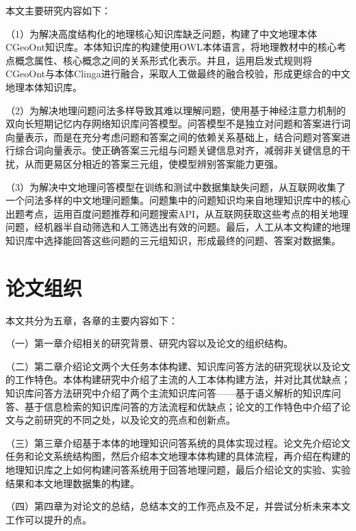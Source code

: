 本文主要研究内容如下：

（1）为解决高度结构化的地理核心知识库缺乏问题，构建了中文地理本体CGeoOnt知识库。本体知识库的构建使用OWL本体语言，将地理教材中的核心考点概念属性、核心概念之间的关系形式化表示。并且，运用启发式规则将CGeoOnt与本体Clinga进行融合，采取人工做最终的融合校验，形成更综合的中文地理本体知识库。

（2）为解决地理问题问法多样导致其难以理解问题，使用基于神经注意力机制的双向长短期记忆内存网络知识库问答模型。问答模型不是独立对问题和答案进行词向量表示，而是在充分考虑问题和答案之间的依赖关系基础上，结合问题对答案进行综合词向量表示。使正确答案三元组与问题关键信息对齐，减弱非关键信息的干扰，从而更易区分相近的答案三元组，使模型辨别答案能力更强。

（3）为解决中文地理问答模型在训练和测试中数据集缺失问题，从互联网收集了一个问法多样的中文地理问题集。问题集中的问题知识均来自地理知识库中的核心出题考点，运用百度问题推荐和问题搜索API，从互联网获取这些考点的相关地理问题，经机器半自动筛选和人工筛选出有效的问题。最后，人工从本文构建的地理知识库中选择能回答这些问题的三元组知识，形成最终的问题、答案对数据集。

\section{论文组织}
本文共分为五章，各章的主要内容如下：

（一）第一章介绍相关的研究背景、研究内容以及论文的组织结构。

（二）第二章介绍论文两个大任务本体构建、知识库问答方法的研究现状以及论文的工作特色。本体构建研究中介绍了主流的人工本体构建方法，并对比其优缺点；知识库问答方法研究中介绍了两个主流知识库问答——基于语义解析的知识库问答、基于信息检索的知识库问答的方法流程和优缺点；论文的工作特色中介绍了论文与之前研究的不同之处，以及论文的亮点和创新点。

（三）第三章介绍基于本体的地理知识问答系统的具体实现过程。论文先介绍论文任务和论文系统结构图，然后介绍本文地理本体构建的具体流程，再介绍在构建的地理知识库之上如何构建问答系统用于回答地理问题，最后介绍论文的实验、实验结果和本文地理数据集的构建。

（四）第四章为对论文的总结，总结本文的工作亮点及不足，并尝试分析未来本文工作可以提升的点。